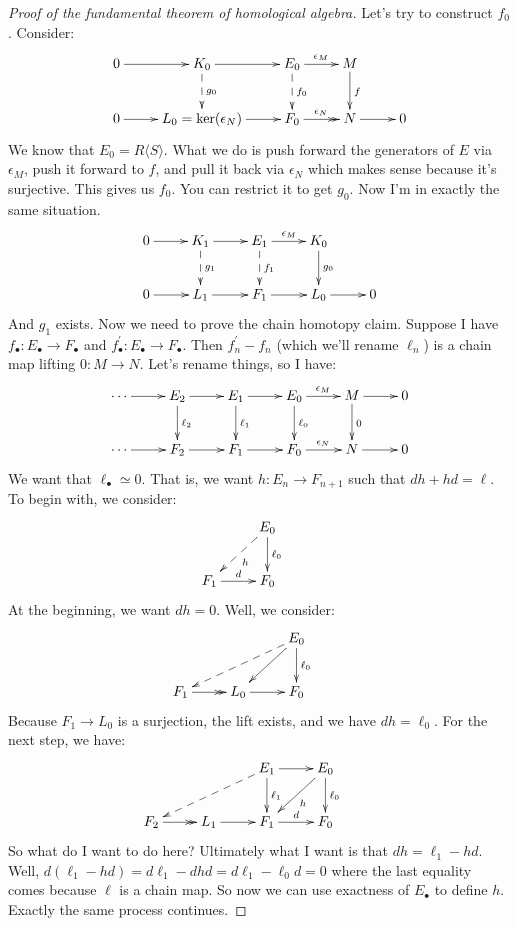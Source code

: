\begin{proof}[Proof of the fundamental theorem of homological algebra]
Let's try to construct $f_0$. Consider:
\begin{equation*}
\xymatrix{0\ar[r] & K_0\ar[r]\ar@{-->}[d]^{g_0} & E_0\ar[r]^{\epsilon_M}\ar@{-->}[d]^{f_0} & M\ar[d]^f &\\
0\ar[r] & L_0=\ker(\epsilon_N)\ar[r] & F_0\ar@{->>}[r]^{\epsilon_N} & N\ar[r] & 0}
\end{equation*}
We know that $E_0=R\langle S\rangle$. What we do is push forward the generators of $E$ via $\epsilon_M$, push it forward to $f$, and pull it back via $\epsilon_N$ which makes sense because it's surjective. This gives us $f_0$. You can restrict it to get $g_0$. Now I'm in exactly the same situation.
\begin{equation*}
\xymatrix{0\ar[r] & K_1\ar[r]\ar@{-->}[d]^{g_1} & E_1\ar[r]^{\epsilon_M}\ar@{-->}[d]^{f_1} & K_0\ar[d]^{g_0} &\\
0\ar[r] & L_1\ar[r] & F_1\ar[r] & L_0\ar[r] & 0}
\end{equation*}
And $g_1$ exists. Now we need to prove the chain homotopy claim. Suppose I have $f_\bullet:E_\bullet\to F_\bullet$ and $f^{\prime}_\bullet:E_\bullet\to F_\bullet$. Then $f^\prime_n-f_n$ (which we'll rename $\ell_n$) is a chain map lifting $0:M\to N$. Let's rename things, so I have:
\begin{equation*}
\xymatrix{\cdots\ar[r] & E_2\ar[r]\ar[d]^{\ell_2} & E_1\ar[r]\ar[d]^{\ell_1} & E_0\ar[r]^{\epsilon_M}\ar[d]^{\ell_0} & M\ar[d]^0\ar[r] & 0\\
\cdots\ar[r] & F_2\ar[r] & F_1\ar[r] & F_0\ar[r]^{\epsilon_N} & N\ar[r] & 0}
\end{equation*}
We want that $\ell_\bullet\simeq 0$. That is, we want $h:E_n\to F_{n+1}$ such that $dh+hd=\ell$. To begin with, we consider:
\begin{equation*}
\xymatrix{ & E_0\ar[d]^{\ell_0}\ar@{-->}[dl]^h & \\
F_1\ar[r]^d & F_0}
\end{equation*}
At the beginning, we want $dh=0$. Well, we consider:
\begin{equation*}
\xymatrix{ & & E_0\ar[d]^{\ell_0}\ar[dl]\ar@{-->}[dll] & \\
F_1\ar@{->>}[r] & L_0\ar[r] & F_0}
\end{equation*}
Because $F_1\to L_0$ is a surjection, the lift exists, and we have $dh=\ell_0$. For the next step, we have:
\begin{equation*}
\xymatrix{ & & E_1\ar[r]\ar[d]^{\ell_1}\ar@{-->}[dll] & E_0\ar[d]^{\ell_0}\ar[dl]^h & \\
F_2\ar@{->>}[r] & L_1\ar[r] & F_1\ar[r]^d & F_0}
\end{equation*}
So what do I want to do here? Ultimately what I want is that $dh=\ell_1-hd$. Well, $d(\ell_1-hd)=d\ell_1-dhd=d\ell_1-\ell_0d=0$ where the last equality comes because $\ell$ is a chain map. So now we can use exactness of $E_\bullet$ to define $h$. Exactly the same process continues.
\end{proof}
